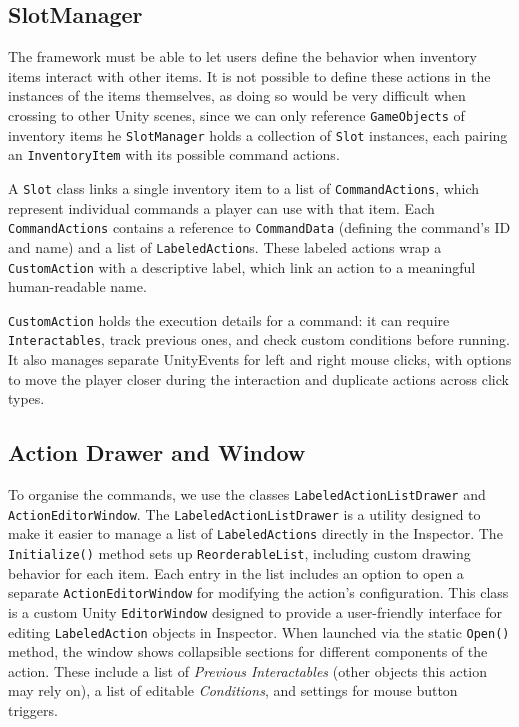 \subsection{SlotManager}
The framework must be able to let users define the behavior when inventory items interact with other items. It is not possible to define these actions in the instances of the items themselves, as doing so would be very difficult when crossing to other Unity scenes, since we can only reference \verb|GameObjects| of inventory items he \verb|SlotManager| holds a collection of \verb|Slot| instances, each pairing an \verb|InventoryItem| with its possible command actions.

A \verb|Slot| class links a single inventory item to a list of \verb|CommandActions|, which represent individual commands a player can use with that item. Each \verb|CommandActions| contains a reference to \verb|CommandData| (defining the command’s ID and name) and a list of \verb|LabeledAction|s. These labeled actions wrap a \verb|CustomAction| with a descriptive label, which link an action to a meaningful human-readable name.

\verb|CustomAction| holds the execution details for a command: it can require \verb|Interactables|, track previous ones, and check custom conditions before running. It also manages separate UnityEvents for left and right mouse clicks, with options to move the player closer during the interaction and duplicate actions across click types.


\subsection{Action Drawer and Window}
To organise the commands, we use the classes \verb|LabeledActionListDrawer| and \verb|ActionEditorWindow|. The \verb|LabeledActionListDrawer| is a utility designed to make it easier to manage a list of \verb|LabeledActions| directly in the Inspector. The \verb|Initialize()| method sets up \verb|ReorderableList|, including custom drawing behavior for each item. Each entry in the list includes an option to open a separate \verb|ActionEditorWindow| for modifying the action’s configuration. This class is a custom Unity \verb|EditorWindow| designed to provide a user-friendly interface for editing \verb|LabeledAction| objects in Inspector. When launched via the static \verb|Open()| method, the window shows collapsible sections for different components of the action. These include a list of \textit{Previous Interactables} (other objects this action may rely on), a list of editable \textit{Conditions}, and settings for mouse button triggers.

